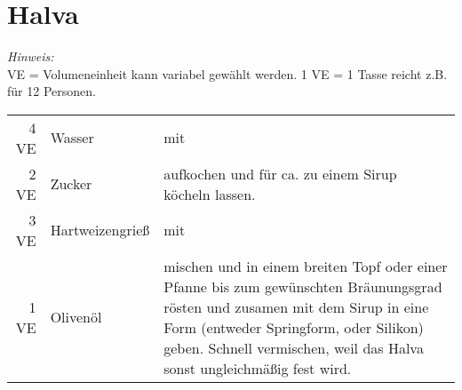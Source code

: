 \section{Halva}
\emph{Hinweis:}\\
VE = Volumeneinheit kann variabel gewählt werden.
1 VE = 1 Tasse reicht z.B. für 12 Personen.\\
\begin{longtable}{rlL{16.8cm}}
	4 VE	&	Wasser			&	mit \\
	2 VE	&	Zucker			&	aufkochen und für ca.  zu einem Sirup köcheln lassen.	\\
	3 VE	&	Hartweizengrieß	&	mit \\
	1 VE	&	Olivenöl		&	mischen und in einem breiten Topf oder einer Pfanne bis zum gewünschten Bräunungsgrad rösten und zusamen mit dem Sirup in eine Form (entweder Springform, oder Silikon) geben.
									Schnell vermischen, weil das Halva sonst ungleichmäßig fest wird.	\\
\end{longtable}